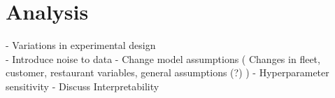 \chapter{Analysis}
- Variations in experimental design \\ 
	- Introduce noise to data
	- Change model assumptions (
		Changes in 
			fleet,
			customer, 
			restaurant variables,
			general assumptions	(?) 
	)
	- Hyperparameter sensitivity
- Discuss Interpretability 